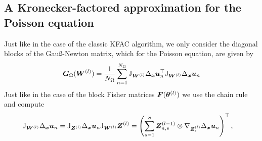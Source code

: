 
\subsection{A Kronecker-factored approximation for the Poisson equation}

Just like in the case of the classic KFAC algorithm, we only consider the diagonal blocks of the Gauß-Newton matrix, which for the Poisson equation, are given by
\begin{align}
    {\bm{G}}_\Omega({\bm{W}}^{(l)}) = \frac1{{N_\Omega}} \sum_{n=1}^{N_\Omega} \mathrm{J}_{{\bm{W}}^{(l)}} \Delta_{\bm{x}} {\bm{u}}_n^\top \mathrm{J}_{{\bm{W}}^{(l)}} \Delta_{\bm{x}} {\bm{u}}_n
\end{align}
Just like in the case of the block Fisher matrices ${\bm{F}}({\bm{\theta}}^{(l)})$ we use the chain rule and compute
\begin{align*}
    \jac_{\mW^{(l)}} \Delta_\vx \vu_n & = \jac_{\mZ^{(l)}}\Delta_\vx \vu_n \jac_{\mW^{(l)}} \mZ^{(l)} %
    = \left(\sum_{s=1}^S \mZ^{(l-1)}_{n,s} \otimes \nabla_{\mZ^{(l)}_s} \Delta_{\vx}\vu_n\right)^\top,
\end{align*}
